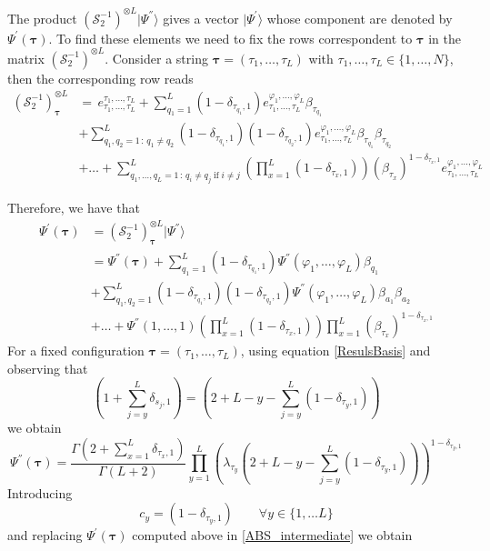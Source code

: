 \documentclass[11pt]{article}
\numberwithin{equation}{section}
\numberwithin{equation}{subsection}
\begin{document}
The product $\left(\mathcal{S}_{2}^{-1}\right)^{\otimes L}|\Psi^{''}\rangle$ gives a vector $|\Psi^{'}\rangle$ whose component are denoted by $\Psi^{'}(\bm{\tau})$. 
To find these elements we need to fix the rows correspondent to $\bm{\tau}$ in the matrix $\left(\mathcal{S}_{2}^{-1}\right)^{\otimes L}$. Consider a string $\bm{\tau}=(\tau_{1},\ldots,\tau_{L})$ with $\tau_{1},\ldots,\tau_{L}\in \{1,\ldots,N\}$, then the corresponding row reads
\begin{equation}
	\begin{split}
\left(\mathcal{S}_{2}^{-1}\right)^{\otimes L}_{\bm{\tau}}&=\,e_{\tau_{1},\ldots,\tau_{L}}^{\tau_{1},\ldots,\tau_{L}}+\sum_{q_{1}=1}^{L}(1-\delta_{\tau_{q_{1}},1})e_{\tau_{1},\ldots,\tau_{L}}^{\varphi_{1},\ldots,\varphi_{L}}\beta_{\tau_{q_{1}}}\\&+\sum_{q_{1},q_{2}=1\,:\,q_{1}\neq q_{2}}^{L}(1-\delta_{\tau_{q_{1}},1})(1-\delta_{\tau_{q_{2}},1})e_{\tau_{1},\ldots,\tau_{L}}^{\varphi_{1},\ldots,\varphi_{L}}\beta_{\tau_{q_{1}}}\beta_{\tau_{q_{2}}}
  \\&+
  \ldots+\sum_{q_{1},\ldots,q_{L}=1\,:\,q_{i}\neq q_{j}\;\text{if}\;i\neq j}^{L}\left(\prod_{x=1}^{L}(1-\delta_{\tau_{x},1})\right)\left(\beta_{\tau_{x}}\right)^{1-\delta_{\tau_{x},1}}e_{\tau_{1},\ldots,\tau_{L}}^{\varphi_{1},\ldots,\varphi_{L}}
	\end{split}
\end{equation}

Therefore, we have that 
\begin{equation}\label{ABS_intermediate}
	\begin{split}
		\Psi^{'}(\bm{\tau})&=(\mathcal{S}_{2}^{-1})_{\bm{\tau}}^{\otimes L}|\Psi^{''}\rangle\\&= \Psi^{''}(\bm{\tau})+\sum_{q_{1}= 1}^{L}(1-\delta_{\tau_{q_{1}},1})\Psi^{''}(\varphi_{1},\ldots,\varphi_{L})\beta_{q_{1}}\\&+
		\sum_{q_{1},q_{2}= 1}^{L}(1-\delta_{\tau_{q_{1}},1})(1-\delta_{\tau_{q_{2}},1})\Psi^{''}(\varphi_{1},\ldots,\varphi_{L})\beta_{a_{1}}\beta_{a_{2}}\\&+\ldots+\Psi^{''}(1,\ldots,1)\left(\prod_{x=1}^{L}(1-\delta_{\tau_{x},1})\right)\prod_{x=1}^{L}\left(\beta_{\tau_{x}}\right)^{1-\delta_{\tau_{x},1}}
	\end{split}
\end{equation}
For a fixed configuration $\bm{\tau}=(\tau_{1},\ldots,\tau_{L})$, using equation \eqref{ResulsBasis} and observing that 
\begin{equation}
  \left(1+\sum_{j=y}^{L}\delta_{s_{j},1}\right) =\left(2+L-y-\sum_{j=y}^{L}(1-\delta_{\tau_{y},1})\right)
\end{equation}
we obtain 
    \begin{equation}
\Psi^{''}(\bm{\tau})=\frac{\Gamma(2+\sum_{x=1}^{L}\delta_{\tau_{x},1})}{\Gamma(L+2)}\prod_{y=1}^{L}\left(\lambda_{\tau_{y}}\left(2+L-y-\sum_{j=y}^{L}(1-\delta_{\tau_{y},1})\right)\right)^{1-\delta_{\tau_{y},1}}
\end{equation}
Introducing
\begin{equation}
	c_{y}=(1-\delta_{\tau_{y},1}) \qquad \forall y\in \{1,\ldots L\}
\end{equation}
and replacing $\Psi^{'}(\bm{\tau})$ computed above in \eqref{ABS_intermediate} we obtain 
\end{document}

